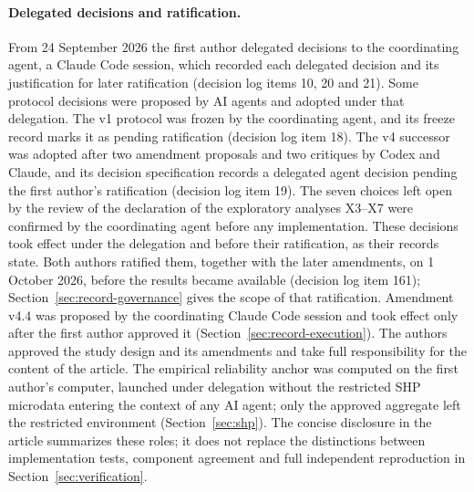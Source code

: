 \paragraph{Delegated decisions and ratification.}
From 24 September 2026 the first author delegated decisions to the coordinating agent, a Claude Code session, which recorded each delegated decision and its justification for later ratification (decision log items 10, 20 and 21). Some protocol decisions were proposed by AI agents and adopted under that delegation. The v1 protocol was frozen by the coordinating agent, and its freeze record marks it as pending ratification (decision log item 18). The v4 successor was adopted after two amendment proposals and two critiques by Codex and Claude, and its decision specification records a delegated agent decision pending the first author's ratification (decision log item 19). The seven choices left open by the review of the declaration of the exploratory analyses X3--X7 were confirmed by the coordinating agent before any implementation. These decisions took effect under the delegation and before their ratification, as their records state. Both authors ratified them, together with the later amendments, on 1 October 2026, before the results became available (decision log item 161); Section~\ref{sec:record-governance} gives the scope of that ratification. Amendment v4.4 was proposed by the coordinating Claude Code session and took effect only after the first author approved it (Section~\ref{sec:record-execution}). The authors approved the study design and its amendments and take full responsibility for the content of the article. %
The empirical reliability anchor was computed on the first author's computer, launched under delegation without the restricted SHP microdata entering the context of any AI agent; only the approved aggregate left the restricted environment (Section~\ref{sec:shp}). The concise disclosure in the article summarizes these roles; it does not replace the distinctions between implementation tests, component agreement and full independent reproduction in Section~\ref{sec:verification}.

